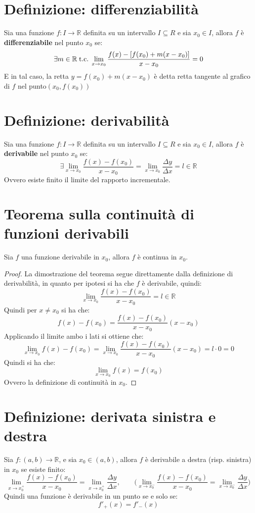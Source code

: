 \documentclass[a4paper,12pt,openright]{book}
\begin{document}
    \section{Definizione: differenziabilità}
    Sia una funzione $f: I \longrightarrow \mathbb{R}$ definita su un intervallo $I \subseteq R$ e sia $x_0 \in I$, allora $f$ è \textbf{differenziabile} nel punto $x_0$ se:
    \[\exists m \in \mathbb{R} \;\text{t.c.}\; \lim_{x \rightarrow x_0} \frac{f(x) - [f(x_0) + m(x - x_0)]}{x - x_0} = 0\]
    E in tal caso, la retta $y = f(x_0) + m(x - x_0)$ è detta retta tangente al grafico di $f$ nel punto$(x_0, f(x_0))$
    
    \section{Definizione: derivabilità}
    Sia una funzione $f: I \longrightarrow \mathbb{R}$ definita su un intervallo $I \subseteq R$ e sia $x_0 \in I$, allora $f$ è \textbf{derivabile} nel punto $x_0$ se:
    \[\exists \lim_{x \rightarrow x_0} \frac{f(x) - f(x_0)}{x - x_0} = \lim_{x \rightarrow x_0} \frac{\Delta y}{\Delta x} = l \in \mathbb{R}\]
    Ovvero esiste finito il limite del rapporto incrementale.
    
    \section{Teorema sulla continuità di funzioni derivabili}
    Sia $f$ una funzione derivabile in $x_0$, allora $f$ è continua in $x_0$.
    
    \begin{proof} La dimostrazione del teorema segue direttamente dalla definizione di derivabilità, in quanto per ipotesi si ha che $f$ è derivabile, quindi: 
    \[\lim_{x \rightarrow x_0} \frac{f(x) - f(x_0)}{x - x_0} = l \in \mathbb{R}\]
    Quindi per $x \not = x_0$ si ha che:
    \[f(x) - f(x_0) = \frac{f(x) - f(x_0)}{x - x_0} (x - x_0)\]
    Applicando il limite ambo i lati si ottiene che:
    \[\lim_{x \rightarrow x_0} f(x) - f(x_0) = \lim_{x \rightarrow x_0} \frac{f(x) - f(x_0)}{x - x_0} (x - x_0) = l \cdot 0 = 0\]
    Quindi si ha che:
    \[\lim_{x \rightarrow x_0} f(x) = f(x_0)\]
    Ovvero la definizione di continuità in $x_0$.
    \end{proof}
    
    \section{Definizione: derivata sinistra e destra}
    Sia $f: (a, b) \rightarrow \mathbb{R}$, e sia $x_0 \in (a, b)$, allora $f$ è derivabile a destra (risp. sinistra) in $x_0$ se esiste finito:
    \[\lim_{x \rightarrow x_0^+} \frac{f(x) - f(x_0)}{x - x_0} = \lim_{x \rightarrow x_0^+} \frac{\Delta y}{\Delta x}, \quad \quad \big(\lim_{x \rightarrow x_0^-} \frac{f(x) - f(x_0)}{x - x_0} = \lim_{x \rightarrow x_0^-} \frac{\Delta y}{\Delta x}\big)\]
    Quindi una funzione è derivabile in un punto se e solo se:
    \[f'_+(x) = f'_-(x)\]
    
\end{document}
